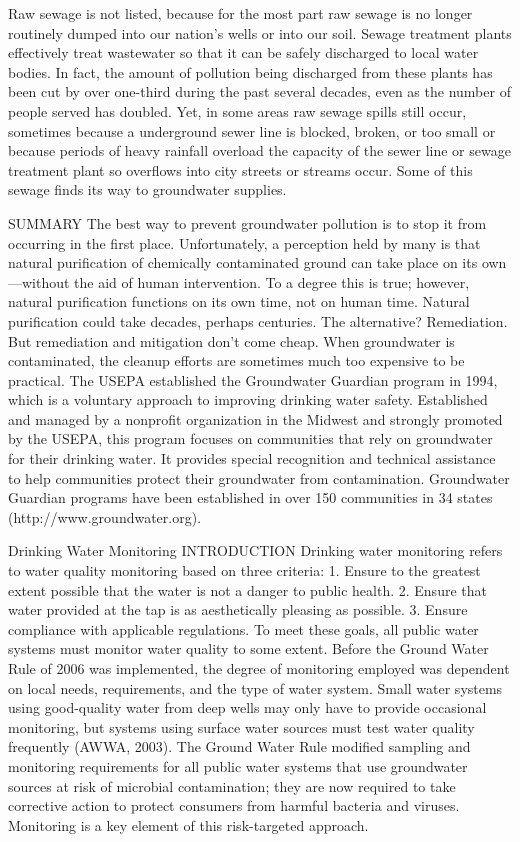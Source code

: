 \documentclass{article}
\begin{document}
Raw sewage is not listed, because for the most part raw sewage is no
longer routinely dumped into our nation's wells or into our soil. Sewage
treatment plants effectively treat wastewater so that it can be safely
discharged to local water bodies. In fact, the amount of pollution being
discharged from these plants has been cut by over one-third during the
past several decades, even as the number of people served has doubled.
Yet, in some areas raw sewage spills still occur, sometimes because a
underground sewer line is blocked, broken, or too small or because
periods of heavy rainfall overload the capacity of the sewer line or
sewage treatment plant so overflows into city streets or streams occur.
Some of this sewage finds its way to groundwater supplies.

SUMMARY The best way to prevent groundwater pollution is to stop it from
occurring in the first place. Unfortunately, a perception held by many
is that natural purification of chemically contaminated ground can take
place on its own---without the aid of human intervention. To a degree
this is true; however, natural purification functions on its own time,
not on human time. Natural purification could take decades, perhaps
centuries. The alternative? Remediation. But remediation and mitigation
don't come cheap. When groundwater is contaminated, the cleanup efforts
are sometimes much too expensive to be practical. The USEPA established
the Groundwater Guardian program in 1994, which is a voluntary approach
to improving drinking water safety. Established and managed by a
nonprofit organization in the Midwest and strongly promoted by the
USEPA, this program focuses on communities that rely on groundwater for
their drinking water. It provides special recognition and technical
assistance to help communities protect their groundwater from
contamination. Groundwater Guardian programs have been established in
over 150 communities in 34 states (http://www.groundwater.org).

Drinking Water Monitoring INTRODUCTION Drinking water monitoring refers
to water quality monitoring based on three criteria: 1. Ensure to the
greatest extent possible that the water is not a danger to public
health. 2. Ensure that water provided at the tap is as aesthetically
pleasing as possible. 3. Ensure compliance with applicable regulations.
To meet these goals, all public water systems must monitor water quality
to some extent. Before the Ground Water Rule of 2006 was implemented,
the degree of monitoring employed was dependent on local needs,
requirements, and the type of water system. Small water systems using
good-quality water from deep wells may only have to provide occasional
monitoring, but systems using surface water sources must test water
quality frequently (AWWA, 2003). The Ground Water Rule modified sampling
and monitoring requirements for all public water systems that use
groundwater sources at risk of microbial contamination; they are now
required to take corrective action to protect consumers from harmful
bacteria and viruses. Monitoring is a key element of this risk-targeted
approach.
\end{document}
